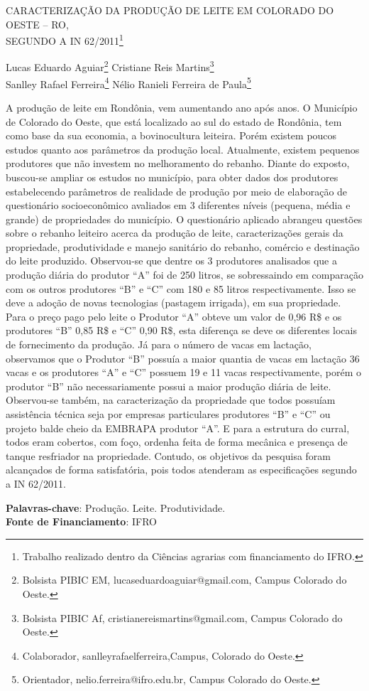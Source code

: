 \documentclass[article,12pt,onesidea,4paper,english,brazil]{abntex2}
\begin{document}
	
	
	\frenchspacing 
	
	\begin{center}
		\LARGE CARACTERIZAÇÃO DA PRODUÇÃO DE LEITE EM COLORADO DO OESTE – RO, \\SEGUNDO A IN 62/2011\footnote{Trabalho realizado dentro da Ciências agrarias com financiamento do IFRO.}
		
		\normalsize
	Lucas Eduardo Aguiar\footnote{Bolsista PIBIC EM, lucaseduardoaguiar@gmail.com, Campus Colorado do Oeste.} 
	Cristiane Reis Martins\footnote{Bolsista PIBIC Af, cristianereismartins@gmail.com, Campus Colorado do Oeste.} \\
		Sanlley Rafael Ferreira\footnote{Colaborador, sanlleyrafaelferreira,Campus, Colorado do Oeste.} 
		Nélio Ranieli Ferreira de Paula\footnote{Orientador, nelio.ferreira@ifro.edu.br, Campus Colorado do Oeste.} 
	\end{center}
	
	\noindent A produção de leite em Rondônia, vem aumentando ano após anos. O Município de Colorado do Oeste, que está localizado ao sul do estado de Rondônia, tem como base da sua economia, a bovinocultura leiteira. Porém existem poucos estudos quanto aos parâmetros da produção local. Atualmente, existem pequenos produtores que não investem no melhoramento do rebanho. Diante do exposto, buscou-se ampliar os estudos no município, para obter dados dos produtores estabelecendo parâmetros de realidade de produção por meio de elaboração de questionário socioeconômico avaliados em 3 diferentes níveis (pequena, média e grande) de propriedades do município. O questionário aplicado abrangeu questões sobre o rebanho leiteiro acerca da produção de leite, caracterizações gerais da propriedade, produtividade e manejo sanitário do rebanho, comércio e destinação do leite produzido. Observou-se que dentre os 3 produtores analisados que a produção diária do produtor “A” foi de 250 litros, se sobressaindo em comparação com os outros produtores “B” e “C” com 180 e 85 litros respectivamente. Isso se deve a adoção de novas tecnologias (pastagem irrigada), em sua propriedade. Para o preço pago pelo leite o Produtor “A” obteve um valor de 0,96 R\$ e os produtores “B” 0,85 R\$ e “C” 0,90 R\$, esta diferença se deve os diferentes locais de fornecimento da produção. Já para o número de vacas em lactação, observamos que o Produtor “B” possuía a maior quantia de vacas em lactação 36 vacas e os produtores “A” e “C” possuem 19 e 11 vacas respectivamente, porém o produtor “B” não necessariamente possui a maior produção diária de leite. Observou-se também, na caracterização da propriedade que todos possuíam assistência técnica seja por empresas particulares produtores “B” e “C” ou projeto balde cheio da EMBRAPA produtor “A”. E para a estrutura do curral, todos eram cobertos, com foço, ordenha feita de forma mecânica e presença de tanque resfriador na propriedade. Contudo, os objetivos da pesquisa foram alcançados de forma satisfatória, pois todos atenderam as especificações segundo a IN 62/2011.
	
	\vspace{\onelineskip}
	
	\noindent
	\textbf{Palavras-chave}: Produção. Leite. Produtividade. \\
	\textbf{Fonte de Financiamento}: IFRO
	
\end{document}
